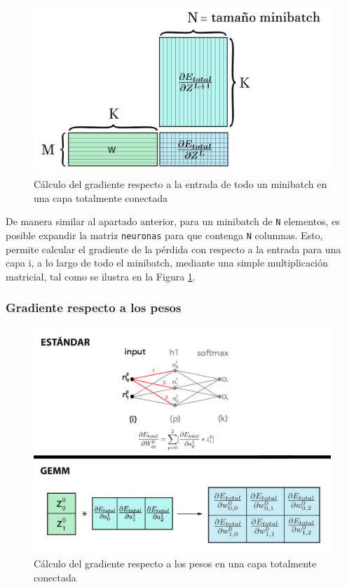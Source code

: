\begin{figure}[H]
	\centering
	\includegraphics[scale=0.25]{imagenes/gemm_fully_back_input_minibatch.jpg}  
	\caption{Cálculo del gradiente respecto a la entrada de todo un minibatch en una capa totalmente conectada}
	\label{fig:gemm_fully_back_input_minibatch}
\end{figure}

De manera similar al apartado anterior, para un minibatch de \texttt{N} elementos, es posible expandir la matriz \texttt{neuronas} para que contenga \texttt{N} columnas. Esto, permite calcular el gradiente de la pérdida con respecto a la entrada para una capa i, a lo largo de todo el minibatch, mediante una simple multiplicación matricial, tal como se ilustra en la Figura \ref{fig:gemm_fully_back_input_minibatch}.

\subsubsection{Gradiente respecto a los pesos}
\begin{figure}[H]
	\centering
	\includegraphics[scale=0.3]{imagenes/gemm_fully_back_w.jpg}  
	\caption{Cálculo del gradiente respecto a los pesos en una capa totalmente conectada}
	\label{fig:gemm_fully_back_w}
\end{figure}

